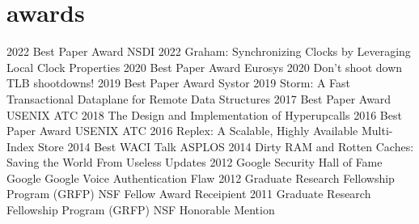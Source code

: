 \section{awards}

\begin{entrylist}
\entry
{2022}
{Best Paper Award}
{NSDI 2022}
{Graham: Synchronizing Clocks by Leveraging Local Clock Properties}
\entry
{2020}
{Best Paper Award}
{Eurosys 2020}
{Don’t shoot down TLB shootdowns!}
\entry
{2019}
{Best Paper Award}
{Systor 2019}
{Storm: A Fast Transactional Dataplane for Remote Data Structures}
\entry
{2017}
{Best Paper Award}
{USENIX ATC 2018}
{The Design and Implementation of Hyperupcalls}
\entry
{2016}
{Best Paper Award}
{USENIX ATC 2016}
{Replex: A Scalable, Highly Available Multi-Index Store}
\entry
{2014}
{Best WACI Talk}
{ASPLOS 2014}
{Dirty RAM and Rotten Caches: Saving the World From Useless Updates}
\entry
{2012}
{Google Security Hall of Fame}
{Google}
{Google Voice Authentication Flaw}
\entry
{2012}
{Graduate Research Fellowship Program (GRFP)}
{NSF}
{Fellow Award Receipient}
\entry
{2011}
{Graduate Research Fellowship Program (GRFP)}
{NSF}
{Honorable Mention}
\end{entrylist}
